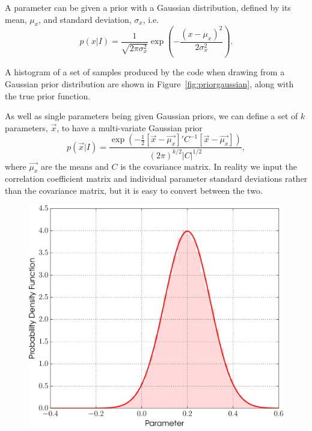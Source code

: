 A parameter can be given a prior with a Gaussian distribution, defined by its mean, $\mu_x$, and standard deviation, $\sigma_x$, i.e.\
\begin{equation}
 p(x|I) = \frac{1}{\sqrt{2\pi\sigma_x^2}}\exp{\left(-\frac{(x-\mu_x)^2}{2\sigma_x^2}\right)}.
\end{equation}

A histogram of a set of samples produced by the code when drawing from a Gaussian prior distribution are shown in Figure~\ref{fig:priorgaussian},
along with the true prior function.

As well as single parameters being given Gaussian priors, we can define a set of $k$ parameters, $\vec{x}$, to have a multi-variate Gaussian prior
\begin{equation}
 p(\vec{x}|I) = \frac{\exp{\left(-\frac{1}{2}[\vec{x}-\vec{\mu_x}]'C^{-1}[\vec{x}-\vec{\mu_x}] \right)}}{(2\pi)^{k/2}|C|^{1/2}},
\end{equation}
where $\vec{\mu_x}$ are the means and $C$ is the covariance matrix. In reality we input the correlation coefficient matrix and individual
parameter standard deviations rather than the covariance matrix, but it is easy to convert between the two.

\begin{figure}[!phtb]
\begin{center}
\includegraphics[width=1\columnwidth]{./figures/priors/gaussian/gaussian}
\caption{ \protect}
\end{center}
\end{figure}

